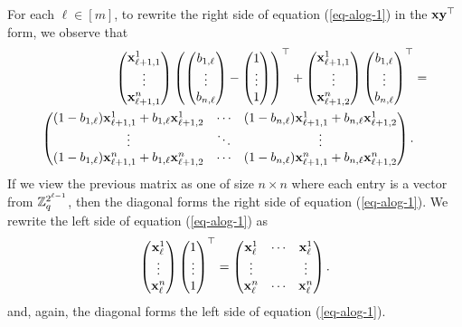 For each $\ell\in[m]$, to rewrite the right side of equation (\ref{eq-alog-1}) in the $\mathbf{x}\mathbf{y}^\top$ form, we observe that
\begin{align*}
\left(\begin{matrix}\mathbf{x}^1_{\ell+1,1}\\\vdots\\\mathbf{x}^n_{\ell+1,1}\end{matrix}\right)\left(\left(\begin{matrix}b_{1,\ell}\\\vdots\\b_{n,\ell}\end{matrix}\right)-\left(\begin{matrix}1\\\vdots\\1\end{matrix}\right)\right)^\top+
\left(\begin{matrix}\mathbf{x}^1_{\ell+1,1}\\\vdots\\\mathbf{x}^n_{\ell+1,2}\end{matrix}\right)\left(\begin{matrix}b_{1,\ell}\\\vdots\\b_{n,\ell}\end{matrix}\right)^\top
&=\\
\begin{pmatrix}
(1-b_{1,\ell})\mathbf{x}^1_{\ell+1,1}+b_{1,\ell}\mathbf{x}^1_{\ell+1,2} & \cdots & (1-b_{n,\ell})\mathbf{x}^1_{\ell+1,1}+b_{n,\ell}\mathbf{x}^1_{\ell+1,2}\\
\vdots & \ddots  & \vdots\\ 
(1-b_{1,\ell})\mathbf{x}^n_{\ell+1,1}+b_{1,\ell}\mathbf{x}^n_{\ell+1,2} & \cdots & (1-b_{n,\ell})\mathbf{x}^n_{\ell+1,1}+b_{n,\ell}\mathbf{x}^n_{\ell+1,2}
\end{pmatrix}.&
\end{align*}
If we view the previous matrix as one of size $n\times n$ where each entry is a vector from $\mathbb{Z}_q^{2^{\ell-1}}$, then the diagonal forms the right side of equation (\ref{eq-alog-1}). We rewrite the left side of equation (\ref{eq-alog-1}) as
\begin{align*}
\left(\begin{matrix}\mathbf{x}^1_\ell\\\vdots\\\mathbf{x}^n_\ell\end{matrix}\right)\left(\begin{matrix}1\\\vdots\\1\end{matrix}\right)^\top
=
\begin{pmatrix}
\mathbf{x}^1_\ell & \cdots & \mathbf{x}^1_\ell\\
\vdots          &        & \vdots         \\
\mathbf{x}^n_\ell & \cdots & \mathbf{x}^n_\ell
\end{pmatrix}.
\end{align*}
and, again, the diagonal forms the left side of equation (\ref{eq-alog-1}). 

